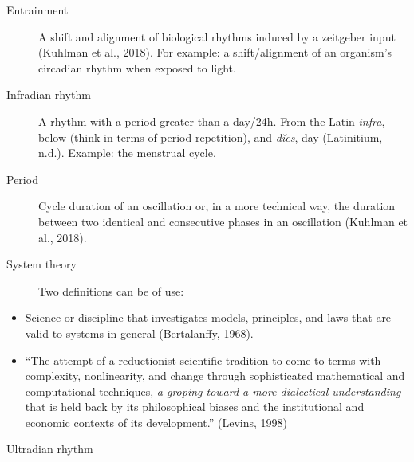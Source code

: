 \begin{termos}
\begin{description}
\item[Entrainment]
\hspace{20cm}

A shift and alignment of biological rhythms induced by a zeitgeber input
(Kuhlman et al., 2018). For example: a shift/alignment of an organism's
circadian rhythm when exposed to light.
\end{description}

\begin{description}
\item[Infradian rhythm]
\hspace{20cm}

A rhythm with a period greater than a day/24h. From the Latin
\emph{infrā}, below (think in terms of period repetition), and
\emph{dĭes}, day (Latinitium, n.d.). Example: the menstrual cycle.
\end{description}

\begin{description}
\item[Period]
\hspace{20cm}

Cycle duration of an oscillation or, in a more technical way, the
duration between two identical and consecutive phases in an oscillation
(Kuhlman et al., 2018).
\end{description}

\begin{description}
\item[System theory]
\hspace{20cm}

Two definitions can be of use:
\end{description}

\begin{itemize}
\tightlist
\item
  Science or discipline that investigates models, principles, and laws
  that are valid to systems in general (Bertalanffy, 1968).
\item
  ``The attempt of a reductionist scientific tradition to come to terms
  with complexity, nonlinearity, and change through sophisticated
  mathematical and computational techniques, \emph{a groping toward a
  more dialectical understanding} that is held back by its philosophical
  biases and the institutional and economic contexts of its
  development.'' (Levins, 1998)
\end{itemize}

\begin{description}
\item[Ultradian rhythm]
\hspace{20cm}


\end{description}
\end{termos}
